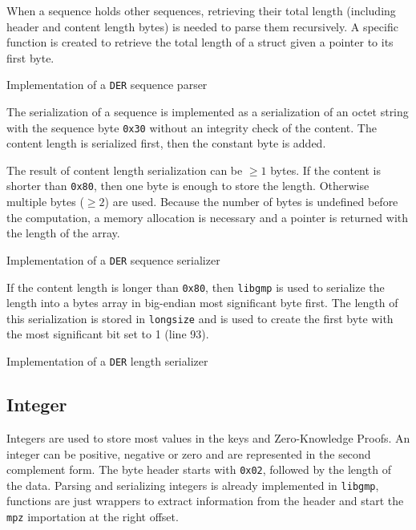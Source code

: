 When a sequence holds other sequences, retrieving their total length (including
header and content length bytes) is needed to parse them recursively. A specific
function is created to retrieve the total length of a struct given a pointer to
its first byte.

\begin{listing}
	\caption{Implementation of a \texttt{DER} sequence parser}
	\label{lst:implDERSequenceParser}
\end{listing}

The serialization of a sequence is implemented as a serialization of an octet
string with the sequence byte \texttt{0x30} without an integrity check of the
content. The content length is serialized first, then the constant byte is added.

The result of content length serialization can be $\geq 1$ bytes. If the
content is shorter than \texttt{0x80}, then one byte is enough to store the
length. Otherwise multiple bytes ($\geq 2$) are used. Because the number of bytes is
undefined before the computation, a memory allocation is necessary and a pointer
is returned with the length of the array.

\begin{listing}
	\caption{Implementation of a \texttt{DER} sequence serializer}
	\label{lst:implDERSequenceSerializer}
\end{listing}

If the content length is longer than \texttt{0x80}, then \texttt{libgmp} is used to
serialize the length into a bytes array in big-endian most significant byte
first. The length of this serialization is stored in \texttt{longsize} and is
used to create the first byte with the most significant bit set to 1 (line 93).

\begin{listing}
	\caption{Implementation of a \texttt{DER} length serializer}
	\label{lst:implDERLengthSerializer}
\end{listing}

\subsection{Integer}

Integers are used to store most values in the keys and Zero-Knowledge
Proofs. An integer can be positive, negative or zero and are represented in the
second complement form. The byte header starts with \texttt{0x02}, followed by the
length of the data. Parsing and serializing integers is already implemented in
\texttt{libgmp}, functions are just wrappers to extract information from the
header and start the \texttt{mpz} importation at the right offset.

